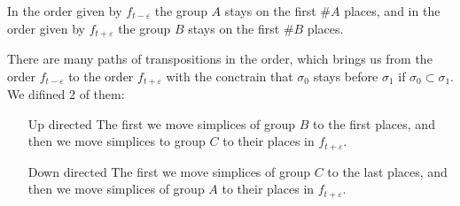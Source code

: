 \documentclass{article}
\begin{document}
In the order given by $f_{t - \varepsilon}$ the group $A$ stays on the first $\#A$ places, and in the order given by $f_{t + \varepsilon}$ the group $B$ stays on the first $\#B$ places.
\par There are many paths of transpositions in the order, which brings us from the order $f_{t - \varepsilon}$ to the order $f_{t + \varepsilon}$ with the conctrain that $\sigma_0$ stays before $\sigma_1$ if $\sigma_0 \subset \sigma_1$. We difined 2 of them:
\begin{itemize}
    \item[Up directed] The first we move simplices of group $B$ to the first places, and then we move simplices to group $C$ to their places in $f_{t + \varepsilon}$.
    \item[Down directed] The first we move simplices of group $C$ to the last places, and then we move simplices of group $A$ to their places in $f_{t + \varepsilon}$.
\end{itemize}
\end{document}

